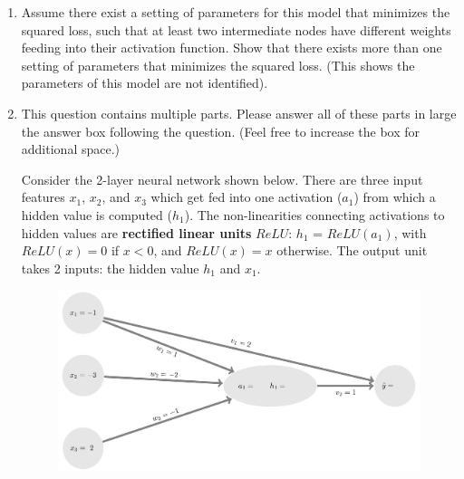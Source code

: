 \documentclass[11pt]{article}
\begin{document}
\begin{enumerate}
\begin{answertext}{10cm}{}


  
\end{answertext} 

\pagebreak

\item Assume there exist a setting of parameters for this model that minimizes the squared loss, such that at least two intermediate nodes have different weights feeding into their activation function.
Show that there exists more than one setting of parameters that minimizes the squared loss.  (This shows the parameters of this model are not identified).

\begin{answertext}{10cm}{}


  
\end{answertext} 

\pagebreak

\item
This question contains multiple parts. Please answer all of these parts in large the answer box following the question. (Feel free to increase the box for additional space.)

Consider the 2-layer neural network shown below. There are three input features $x_1$, $x_2$, and $x_3$ which get fed into one activation ($a_1$) from which a hidden value is computed ($h_1$). The non-linearities connecting activations to hidden values are \textbf{rectified linear units} $ReLU$: $h_1$ = $ReLU(a_1)$, with $ReLU(x) = 0$ if $x < 0$, and $ReLU(x) = x$ otherwise. The output unit takes 2 inputs: the hidden value $h_1$ and $x_1$.

\begin{figure}[htbp]
 \centerline{\includegraphics[scale=0.35]{grad_example.png}}
 \label{fig:backprop}
\end{figure}


\end{enumerate}
\end{document}
